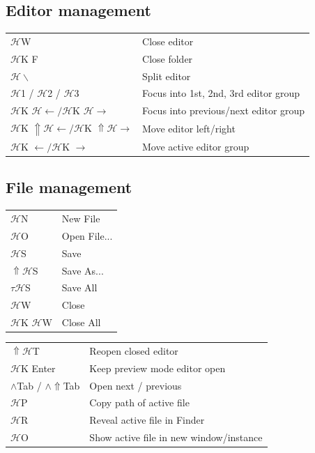 \documentclass[UTF8]{article}
\begin{document}
\subsection*{Editor management}
\begin{tabular}{ll}
$\mathscr{H}$W & Close editor \\
$\mathscr{H}$K F & Close folder \\
$\mathscr{H}\backslash$ & Split editor \\
$\mathscr{H}$1 / $\mathscr{H}$2 / $\mathscr{H}$3 & Focus into 1st, 2nd, 3rd editor group \\
$\mathscr{H}$K $\mathscr{H}\leftarrow / \mathscr{H}$K $\mathscr{H}\rightarrow$ & Focus into previous/next editor group \\
$\mathscr{H}$K $\Uparrow\mathscr{H}\leftarrow / \mathscr{H}$K $\Uparrow\mathscr{H}\rightarrow$ & Move editor left/right \\
$\mathscr{H}$K $\leftarrow / \mathscr{H}$K $\rightarrow$ & Move active editor group
\end{tabular}

\subsection*{File management}
\begin{tabular}{ll}
$\mathscr{H}$N & New File \\
$\mathscr{H}$O & Open File... \\
$\mathscr{H}$S & Save \\
$\Uparrow\mathscr{H}$S & Save As... \\
$\tau\mathscr{H}$S & Save All \\
$\mathscr{H}$W & Close \\
$\mathscr{H}$K $\mathscr{H}$W & Close All
\end{tabular}

\begin{tabular}{ll}
$\Uparrow\mathscr{H}$T & Reopen closed editor \\
$\mathscr{H}$K Enter & Keep preview mode editor open \\
$\wedge$Tab / $\wedge\Uparrow$Tab & Open next / previous \\
$\mathscr{H}$P & Copy path of active file \\
$\mathscr{H}$R & Reveal active file in Finder \\
$\mathscr{H}$O & Show active file in new window/instance
\end{tabular}
\end{document}
